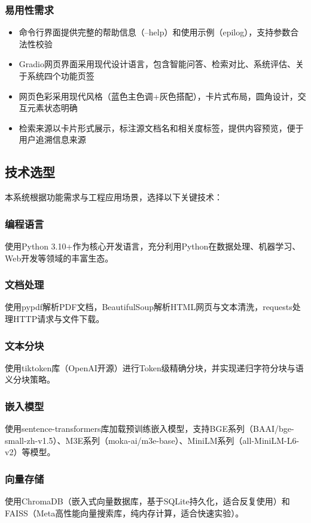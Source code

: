 \documentclass[10pt,a4paper]{article}
\begin{document}
\subsubsection{易用性需求}
\begin{itemize}
\item 命令行界面提供完整的帮助信息（--help）和使用示例（epilog），支持参数合法性校验
\item Gradio网页界面采用现代设计语言，包含智能问答、检索对比、系统评估、关于系统四个功能页签
\item 网页色彩采用现代风格（蓝色主色调+灰色搭配），卡片式布局，圆角设计，交互元素状态明确
\item 检索来源以卡片形式展示，标注源文档名和相关度标签，提供内容预览，便于用户追溯信息来源
\end{itemize}

\subsection{技术选型}

本系统根据功能需求与工程应用场景，选择以下关键技术：

\subsubsection{编程语言}
使用Python 3.10+作为核心开发语言，充分利用Python在数据处理、机器学习、Web开发等领域的丰富生态。

\subsubsection{文档处理}
使用pypdf解析PDF文档，BeautifulSoup解析HTML网页与文本清洗，requests处理HTTP请求与文件下载。

\subsubsection{文本分块}
使用tiktoken库（OpenAI开源）进行Token级精确分块，并实现递归字符分块与语义分块策略。

\subsubsection{嵌入模型}
使用sentence-transformers库加载预训练嵌入模型，支持BGE系列（BAAI/bge-small-zh-v1.5）、M3E系列（moka-ai/m3e-base）、MiniLM系列（all-MiniLM-L6-v2）等模型。

\subsubsection{向量存储}
使用ChromaDB（嵌入式向量数据库，基于SQLite持久化，适合反复使用）和FAISS（Meta高性能向量搜索库，纯内存计算，适合快速实验）。
\end{document}
